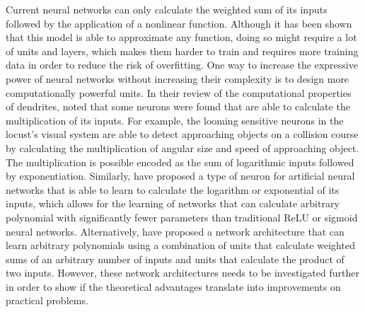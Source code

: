 Current neural networks can only calculate the weighted sum of its inputs
followed by the application of a nonlinear function. Although it has been shown
that this model is able to approximate any function, doing so might require a
lot of units and layers, which makes them harder to train and requires more
training data in order to reduce the risk of overfitting. One way to increase
the expressive power of neural networks without increasing their complexity is
to design more computationally powerful units. In their review of the
computational properties of dendrites, \citet{london2005} noted that some
neurons were found that are able to calculate the multiplication of its inputs.
For example, the looming sensitive neurons in the locust's visual system are
able to detect approaching objects on a collision course by calculating the
multiplication of angular size and speed of approaching object. The
multiplication is possible encoded as the sum of logarithmic inputs followed by
exponentiation. Similarly, \citet{godfrey2016} have proposed a type of neuron
for artificial neural networks that is able to learn to calculate the logarithm
or exponential of its inputs, which allows for the learning of networks that can
calculate arbitrary polynomial with significantly fewer parameters than
traditional ReLU or sigmoid neural networks. Alternatively, \citet{livni2013}
have proposed a network architecture that can learn arbitrary polynomials using
a combination of units that calculate weighted sums of an arbitrary number of
inputs and units that calculate the product of two inputs. However, these
network architectures needs to be investigated further in order to show if the
theoretical advantages translate into improvements on practical problems.
